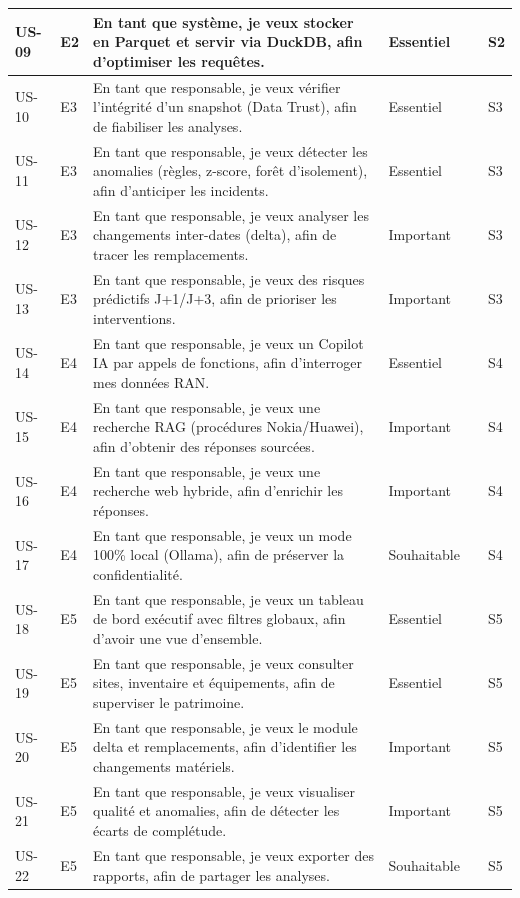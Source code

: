 \documentclass[12pt,a4paper]{report}
\begin{document}
{\begin{longtable}{|>{\centering\arraybackslash}p{0.95cm}|>{\centering\arraybackslash}p{0.8cm}|p{6.2cm}|>{\centering\arraybackslash}p{1.7cm}|>{\centering\arraybackslash}p{0.75cm}|>{\centering\arraybackslash}p{1.35cm}|}
US-09 & E2 & En tant que système, je veux stocker en Parquet et servir via DuckDB, afin d'optimiser les requêtes. & Essentiel & 8 & S2 \\ \hline
US-10 & E3 & En tant que responsable, je veux vérifier l'intégrité d'un snapshot (Data Trust), afin de fiabiliser les analyses. & Essentiel & 8 & S3 \\ \hline
US-11 & E3 & En tant que responsable, je veux détecter les anomalies (règles, z-score, forêt d'isolement), afin d'anticiper les incidents. & Essentiel & 8 & S3 \\ \hline
US-12 & E3 & En tant que responsable, je veux analyser les changements inter-dates (delta), afin de tracer les remplacements. & Important & 5 & S3 \\ \hline
US-13 & E3 & En tant que responsable, je veux des risques prédictifs J+1/J+3, afin de prioriser les interventions. & Important & 8 & S3 \\ \hline
US-14 & E4 & En tant que responsable, je veux un Copilot IA par appels de fonctions, afin d'interroger mes données RAN. & Essentiel & 13 & S4 \\ \hline
US-15 & E4 & En tant que responsable, je veux une recherche RAG (procédures Nokia/Huawei), afin d'obtenir des réponses sourcées. & Important & 8 & S4 \\ \hline
US-16 & E4 & En tant que responsable, je veux une recherche web hybride, afin d'enrichir les réponses. & Important & 5 & S4 \\ \hline
US-17 & E4 & En tant que responsable, je veux un mode 100\% local (Ollama), afin de préserver la confidentialité. & Souhaitable & 5 & S4 \\ \hline
US-18 & E5 & En tant que responsable, je veux un tableau de bord exécutif avec filtres globaux, afin d'avoir une vue d'ensemble. & Essentiel & 8 & S5 \\ \hline
US-19 & E5 & En tant que responsable, je veux consulter sites, inventaire et équipements, afin de superviser le patrimoine. & Essentiel & 8 & S5 \\ \hline
US-20 & E5 & En tant que responsable, je veux le module delta et remplacements, afin d'identifier les changements matériels. & Important & 5 & S5 \\ \hline
US-21 & E5 & En tant que responsable, je veux visualiser qualité et anomalies, afin de détecter les écarts de complétude. & Important & 5 & S5 \\ \hline
US-22 & E5 & En tant que responsable, je veux exporter des rapports, afin de partager les analyses. & Souhaitable & 3 & S5 \\ \hline

\end{longtable}}
\end{document}
